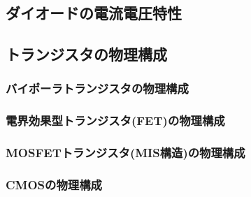    \subsection{ダイオードの電流電圧特性}

    \subsection{トランジスタの物理構成}
        \subsubsection{バイポーラトランジスタの物理構成}

        \subsubsection{電界効果型トランジスタ(FET)の物理構成}

        \subsubsection{MOSFETトランジスタ(MIS構造)の物理構成}

        \subsubsection{CMOSの物理構成}

